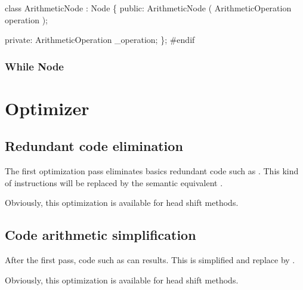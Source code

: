 class ArithmeticNode : Node \{
        public:
                ArithmeticNode ( ArithmeticOperation operation );

        private:
                ArithmeticOperation _operation;
\};
#endif
\nwendcode{}\nwdocspar
\subsubsection{While Node}
\nwenddocs{}\section{Optimizer}

\subsection{Redundant code elimination\label{RCE}}
The first optimization pass eliminates basics redundant code such as \ttt{+++++}. This kind of instructions will be replaced by the semantic equivalent .

Obviously, this optimization is available for head shift methods.

\subsection{Code arithmetic simplification\label{CAS}}
After the first pass, code such as  can results. This is simplified and replace by \ttt{-}.

Obviously, this optimization is available for head shift methods.
\nwenddocs{}
